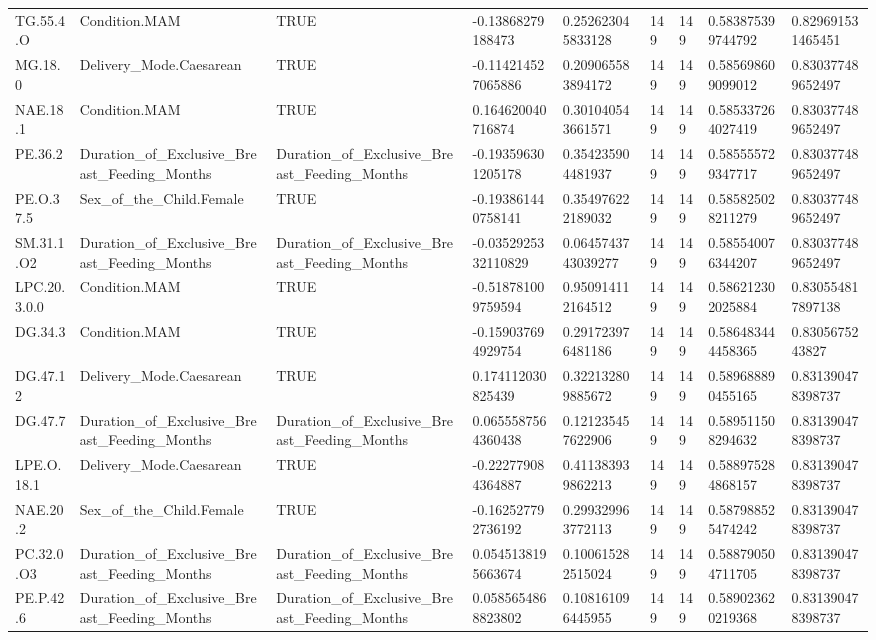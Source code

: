 \begin{longtable}{lllllllll}
TG.55.4.O & Condition.MAM & TRUE & -0.13868279188473 & 0.252623045833128 & 149 & 149 & 0.583875399744792 & 0.829691531465451 \\
MG.18.0 & Delivery\_Mode.Caesarean & TRUE & -0.114214527065886 & 0.209065583894172 & 149 & 149 & 0.585698609099012 & 0.830377489652497 \\
NAE.18.1 & Condition.MAM & TRUE & 0.164620040716874 & 0.301040543661571 & 149 & 149 & 0.585337264027419 & 0.830377489652497 \\
PE.36.2 & Duration\_of\_Exclusive\_Breast\_Feeding\_Months & Duration\_of\_Exclusive\_Breast\_Feeding\_Months & -0.193596301205178 & 0.354235904481937 & 149 & 149 & 0.585555729347717 & 0.830377489652497 \\
PE.O.37.5 & Sex\_of\_the\_Child.Female & TRUE & -0.193861440758141 & 0.354976222189032 & 149 & 149 & 0.585825028211279 & 0.830377489652497 \\
SM.31.1.O2 & Duration\_of\_Exclusive\_Breast\_Feeding\_Months & Duration\_of\_Exclusive\_Breast\_Feeding\_Months & -0.0352925332110829 & 0.0645743743039277 & 149 & 149 & 0.585540076344207 & 0.830377489652497 \\
LPC.20.3.0.0 & Condition.MAM & TRUE & -0.518781009759594 & 0.950914112164512 & 149 & 149 & 0.586212302025884 & 0.830554817897138 \\
DG.34.3 & Condition.MAM & TRUE & -0.159037694929754 & 0.291723976481186 & 149 & 149 & 0.586483444458365 & 0.8305675243827 \\
DG.47.12 & Delivery\_Mode.Caesarean & TRUE & 0.174112030825439 & 0.322132809885672 & 149 & 149 & 0.589688890455165 & 0.831390478398737 \\
DG.47.7 & Duration\_of\_Exclusive\_Breast\_Feeding\_Months & Duration\_of\_Exclusive\_Breast\_Feeding\_Months & 0.0655587564360438 & 0.121235457622906 & 149 & 149 & 0.589511508294632 & 0.831390478398737 \\
LPE.O.18.1 & Delivery\_Mode.Caesarean & TRUE & -0.222779084364887 & 0.411383939862213 & 149 & 149 & 0.588975284868157 & 0.831390478398737 \\
NAE.20.2 & Sex\_of\_the\_Child.Female & TRUE & -0.162527792736192 & 0.299329963772113 & 149 & 149 & 0.587988525474242 & 0.831390478398737 \\
PC.32.0.O3 & Duration\_of\_Exclusive\_Breast\_Feeding\_Months & Duration\_of\_Exclusive\_Breast\_Feeding\_Months & 0.0545138195663674 & 0.100615282515024 & 149 & 149 & 0.588790504711705 & 0.831390478398737 \\
PE.P.42.6 & Duration\_of\_Exclusive\_Breast\_Feeding\_Months & Duration\_of\_Exclusive\_Breast\_Feeding\_Months & 0.0585654868823802 & 0.108161096445955 & 149 & 149 & 0.589023620219368 & 0.831390478398737 \\

\end{longtable}
